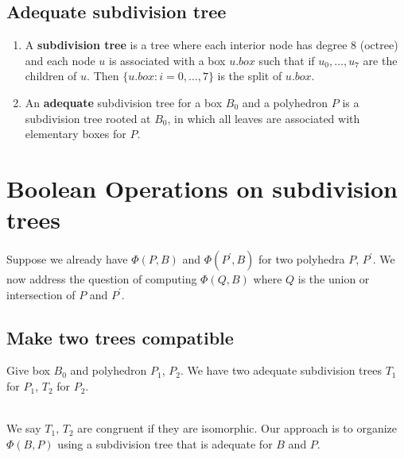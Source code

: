 \documentclass[twoside]{article}
\begin{document}
\begin{multicols}{2}
\subsection{Adequate subdivision tree}

\begin{enumerate}
	\item A \textbf{subdivision tree} is a tree where each interior node has degree 8 (octree) and each node $u$ is associated with a box $u.box$ such that if $u_0,\ldots,u_7$ are the children of $u$. Then $\{u.box: i = 0,\ldots,7\}$ is the split of $u.box$.
	\item An \textbf{adequate} subdivision tree for a box $B_0$ and a polyhedron $P$ is a subdivision tree rooted at $B_0$, in which all leaves are associated with elementary boxes for $P$.\\

\end{enumerate}

\section{Boolean Operations on subdivision trees}
Suppose we already have $\Phi(P,B)$ and $\Phi(P^\prime,B)$ for two polyhedra $P$, $P^\prime$. We now address the question of computing $\Phi(Q,B)$ where $Q$ is the union or intersection of $P$ and $P^\prime$.

\subsection {Make two trees compatible}
\indent
Give box $B_0$ and polyhedron $P_1$, $P_2$. We have two adequate subdivision trees $T_1$ for $P_1$, $T_2$ for $P_2$. 
\\
\\
\indent
\iffalse
Before we do the boolean operation on $T_1$, $T_2$, it's necessary to make them congruent, which means $\forall$ node $n_1$ in $T_1$, $\exists$ $n_2$ in $T_2$ st. $n_1.box = n_2.box$, $\forall$ node $n_2$ in $T_2$, $\exists$ $n_1$ in $T_1$ st. $n_2.box = n_1.box$. We name this process \textbf{even up}.
\fi

\indent We say $T_1$, $T_2$ are congruent if they are isomorphic. Our approach is to organize $\Phi(B,P)$ using a subdivision tree that is adequate for $B$ and $P$.





\end{multicols}
\end{document}
